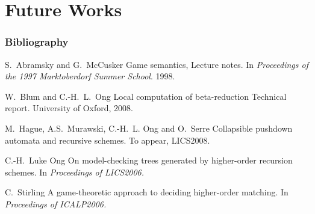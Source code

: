 \section{Future Works}

\begin{frame} \frametitle<presentation>{Bibliography}

  \begin{thebibliography}{10}
  \beamertemplatearticlebibitems
    S.~Abramsky and G.~McCusker
    \newblock Game semantics, Lecture notes.
    \newblock In {\em Proceedings of the 1997 Marktoberdorf Summer School}. 1998.

    W.~Blum and C.-H.~L.~Ong 
    \newblock Local computation of beta-reduction
    \newblock Technical report. University of Oxford, 2008.


    M.~Hague, A.S.~Murawski, C.-H.~L. Ong and O.~Serre
    \newblock Collapsible pushdown automata and recursive schemes.
    \newblock To appear, LICS2008.

    C.-H.~Luke Ong
    \newblock On model-checking trees generated by higher-order recursion schemes.
    \newblock In {\em Proceedings of LICS2006.}

    C.~Stirling
    \newblock A game-theoretic approach to deciding higher-order matching.
    \newblock In {\em Proceedings of ICALP2006.}

  \end{thebibliography}
\end{frame}




